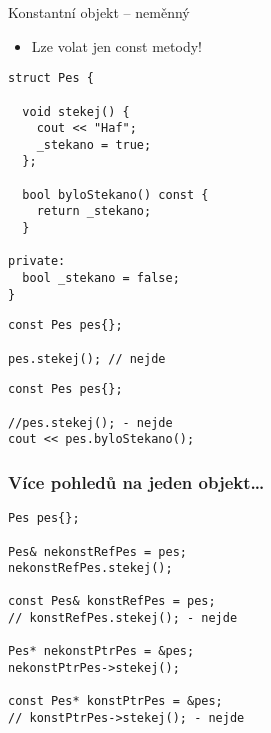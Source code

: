 \begin{frame}[fragile]
\begin{bitemize}
\item Konstantní objekt -- neměnný
\begin{itemize}
\item Lze volat jen const metody!
\end{itemize}
\end{bitemize}

\begin{twocols}
\begin{yesblock}
\begin{lstlisting}[basicstyle=\small]
struct Pes {

  void stekej() { 
    cout << "Haf"; 
    _stekano = true; 
  };

  bool byloStekano() const { 
    return _stekano; 
  }

private:
  bool _stekano = false;
}
\end{lstlisting}
\end{yesblock}

\twocolssep

\begin{noblock}
\begin{lstlisting}[basicstyle=\small]
const Pes pes{};

pes.stekej(); // nejde
\end{lstlisting}
\end{noblock}

\begin{yesblock}
\begin{lstlisting}[basicstyle=\small]
const Pes pes{};

//pes.stekej(); - nejde
cout << pes.byloStekano();
\end{lstlisting}
\end{yesblock}

\end{twocols}
\end{frame}




\begin{frame}[fragile]
\frametitle{Více pohledů na jeden objekt\ldots}

\begin{yesblock}
\begin{lstlisting}
Pes pes{};

Pes& nekonstRefPes = pes;
nekonstRefPes.stekej();

const Pes& konstRefPes = pes;
// konstRefPes.stekej(); - nejde

Pes* nekonstPtrPes = &pes;
nekonstPtrPes->stekej();

const Pes* konstPtrPes = &pes;
// konstPtrPes->stekej(); - nejde
\end{lstlisting}
\end{yesblock}

\end{frame}








